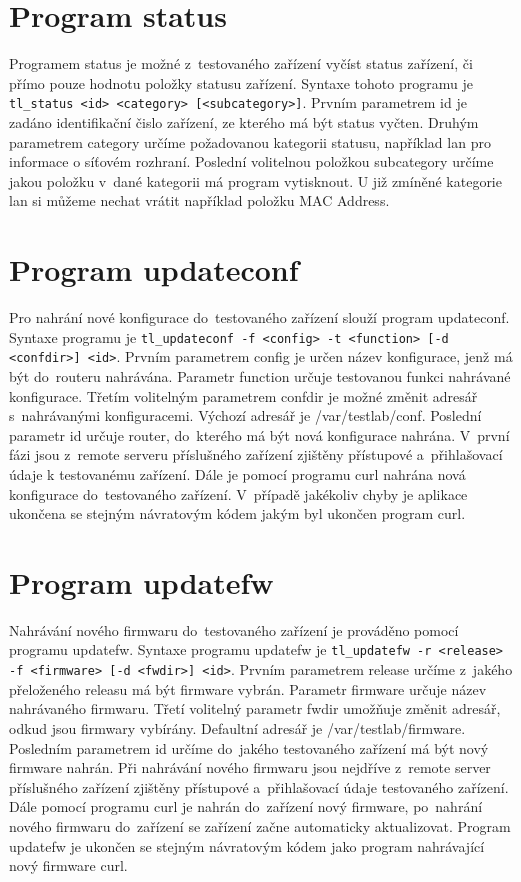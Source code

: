 \section{Program status}
Programem status je možné z~testovaného zařízení vyčíst status zařízení, či přímo pouze hodnotu položky statusu zařízení. Syntaxe tohoto programu je \texttt{tl\_status <id> <category> [<subcategory>]}. Prvním parametrem id je zadáno identifikační čislo zařízení, ze kterého má být status vyčten. Druhým parametrem category určíme požadovanou kategorii statusu, například lan pro informace o síťovém rozhraní. Poslední volitelnou položkou subcategory určíme jakou položku v~dané kategorii má program vytisknout. U již zmíněné kategorie lan si můžeme nechat vrátit například položku MAC Address.

\section{Program updateconf}
Pro nahrání nové konfigurace do~testovaného zařízení slouží program updateconf. Syntaxe programu je \texttt{tl\_updateconf -f <config> -t <function> [-d <confdir>] <id>}. Prvním parametrem config je určen název konfigurace, jenž má být do~routeru nahrávána. Parametr function určuje testovanou funkci nahrávané konfigurace. Třetím volitelným parametrem confdir je možné změnit adresář s~nahrávanými konfiguracemi. Výchozí adresář je /var/testlab/conf. Poslední parametr id určuje router, do~kterého má být nová konfigurace nahrána. V~první fázi jsou z~remote serveru příslušného zařízení zjištěny přístupové a~přihlašovací údaje k testovanému zařízení. Dále je pomocí programu curl nahrána nová konfigurace do~testovaného zařízení. V~případě jakékoliv chyby je aplikace ukončena se stejným návratovým kódem jakým byl ukončen program curl.

\section{Program updatefw}
Nahrávání nového firmwaru do~testovaného zařízení je prováděno pomocí programu updatefw. Syntaxe programu updatefw je \texttt{tl\_updatefw -r <release> -f <firmware> [-d <fwdir>] <id>}. Prvním parametrem release určíme z~jakého přeloženého releasu má být firmware vybrán. Parametr firmware určuje název nahrávaného firmwaru. Třetí volitelný parametr fwdir umožňuje změnit adresář, odkud jsou firmwary vybírány. Defaultní adresář je /var/testlab/firmware. Posledním parametrem id určíme do~jakého testovaného zařízení má být nový firmware nahrán. Při nahrávání nového firmwaru jsou nejdříve z~remote server příslušného zařízení zjištěny přístupové a~přihlašovací údaje testovaného zařízení. Dále pomocí programu curl je nahrán do~zařízení nový firmware, po~nahrání nového firmwaru do~zařízení se zařízení začne automaticky aktualizovat. Program updatefw je ukončen se stejným návratovým kódem jako program nahrávající nový firmware curl.

